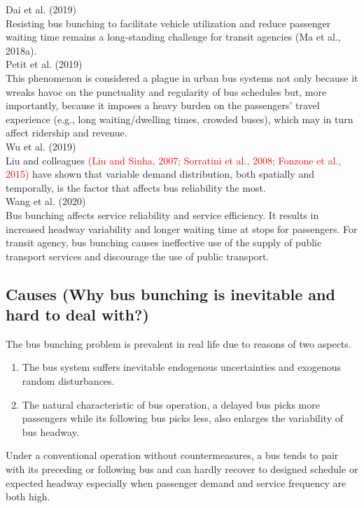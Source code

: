 \documentclass{article}
\begin{document}
\noindent \textrm{Dai et al. (2019)}\\
Resisting bus bunching to facilitate vehicle utilization 
and reduce passenger waiting time 
remains a long-standing challenge for transit agencies 
\textrm{(Ma et al., 2018a)}.\\

\noindent \textrm{Petit et al. (2019)}\\
This phenomenon is considered a plague in urban bus systems 
not only because it wreaks havoc on the punctuality and regularity of bus schedules but,
more importantly, 
because it imposes a heavy burden on the passengers’ travel experience 
(e.g., long waiting/dwelling times, crowded buses), 
which may in turn affect ridership and revenue.\\

\noindent Wu et al. (2019)\\
Liu and colleagues \textcolor{red}{(Liu and Sinha, 2007; Sorratini et al., 2008; Fonzone et al., 2015)} have shown that variable demand distribution, 
both spatially and temporally, is the factor that affects bus reliability the most.\\

\noindent \textrm{Wang et al. (2020)}\\
Bus bunching affects service reliability and service efficiency.
It results in increased headway variability 
and longer waiting time at stops for passengers.
For transit agency, bus bunching causes ineffective use of the supply of public transport services 
and discourage the use of public transport.


\subsection*{Causes (Why bus bunching is inevitable and hard to deal with?)}
The bus bunching problem is prevalent in real life due to reasons of two aspects.
\begin{enumerate}
    \item The bus system suffers inevitable endogenous uncertainties and exogenous random disturbances.
    \item The natural characteristic of bus operation, a delayed bus picks more passengers while its following bus picks less, also enlarges the variability of bus headway.
\end{enumerate}
Under a conventional operation without countermeasures, a bus tends to pair with its preceding or following bus and can hardly recover to designed schedule or expected headway
especially when passenger demand and service frequency are both high.
\end{document}
